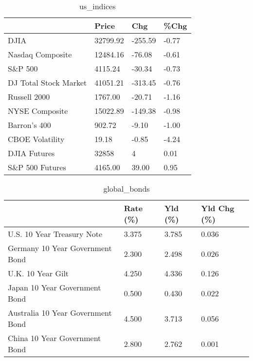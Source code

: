 \documentclass{article}%
\begin{document}
%


\begin{table}[htbp]%
\caption{us\_indices}%
\centering%
\begin{adjustbox}{width=1\textwidth}%
\begin{tabular}{llll}
\toprule
                      &    Price &     Chg &  \%Chg \\
\midrule
                 DJIA & 32799.92 & -255.59 & -0.77 \\
     Nasdaq Composite & 12484.16 &  -76.08 & -0.61 \\
              S\&P 500 &  4115.24 &  -30.34 & -0.73 \\
DJ Total Stock Market & 41051.21 & -313.45 & -0.76 \\
         Russell 2000 &  1767.00 &  -20.71 & -1.16 \\
       NYSE Composite & 15022.89 & -149.38 & -0.98 \\
         Barron's 400 &   902.72 &   -9.10 & -1.00 \\
      CBOE Volatility &    19.18 &   -0.85 & -4.24 \\
         DJIA Futures &    32858 &       4 &  0.01 \\
      S\&P 500 Futures &  4165.00 &   39.00 &  0.95 \\
\bottomrule
\end{tabular}
%
\end{adjustbox}%
\end{table}

%


\begin{table}[htbp]%
\caption{global\_bonds}%
\centering%
\begin{adjustbox}{width=1\textwidth}%
\begin{tabular}{llll}
\toprule
                                  & Rate (\%) & Yld (\%) & Yld Chg (\%) \\
\midrule
       U.S. 10 Year Treasury Note &    3.375 &   3.785 &       0.036 \\
  Germany 10 Year Government Bond &    2.300 &   2.498 &       0.026 \\
                U.K. 10 Year Gilt &    4.250 &   4.336 &       0.126 \\
    Japan 10 Year Government Bond &    0.500 &   0.430 &       0.022 \\
Australia 10 Year Government Bond &    4.500 &   3.713 &       0.056 \\
    China 10 Year Government Bond &    2.800 &   2.762 &       0.001 \\
\bottomrule
\end{tabular}
%
\end{adjustbox}%
\end{table}
\end{document}
